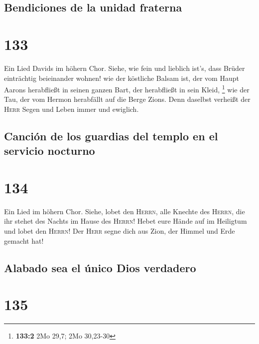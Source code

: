 \hypertarget{bendiciones-de-la-unidad-fraterna}{%
\subsection{Bendiciones de la unidad
fraterna}\label{bendiciones-de-la-unidad-fraterna}}

\hypertarget{section-132}{%
\section{133}\label{section-132}}

 Ein Lied Davids im höhern Chor. Siehe, wie fein und
lieblich ist's, dass Brüder einträchtig beieinander wohnen!
 wie der köstliche Balsam ist, der vom Haupt Aarons
herabfließt in seinen ganzen Bart, der herabfließt in sein Kleid,
\footnote{\textbf{133:2} 2Mo 29,7; 2Mo 30,23-30}  wie der
Tau, der vom Hermon herabfällt auf die Berge Zions. Denn daselbst
verheißt der \textsc{Herr} Segen und Leben immer und ewiglich.

\hypertarget{canciuxf3n-de-los-guardias-del-templo-en-el-servicio-nocturno}{%
\subsection{Canción de los guardias del templo en el servicio
nocturno}\label{canciuxf3n-de-los-guardias-del-templo-en-el-servicio-nocturno}}

\hypertarget{section-133}{%
\section{134}\label{section-133}}

 Ein Lied im höhern Chor. Siehe, lobet den \textsc{Herrn},
alle Knechte des \textsc{Herrn}, die ihr stehet des Nachts im Hause des
\textsc{Herrn}!  Hebet eure Hände auf im Heiligtum und
lobet den \textsc{Herrn}!  Der \textsc{Herr} segne dich
aus Zion, der Himmel und Erde gemacht hat!

\hypertarget{alabado-sea-el-uxfanico-dios-verdadero}{%
\subsection{Alabado sea el único Dios
verdadero}\label{alabado-sea-el-uxfanico-dios-verdadero}}

\hypertarget{section-134}{%
\section{135}\label{section-134}}

